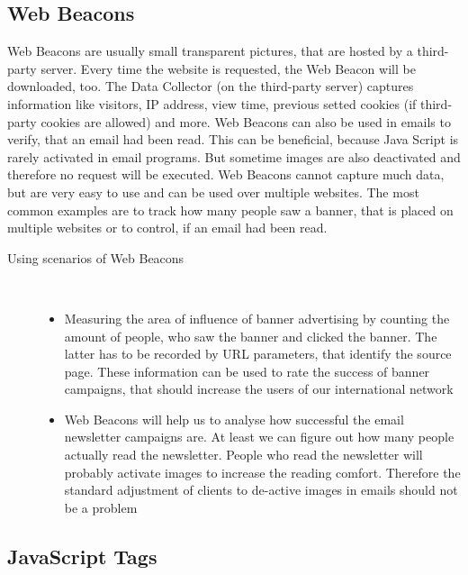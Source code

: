 \subsection{Web Beacons} %
\label{sub:web_beacons}
Web Beacons are usually small transparent pictures, that are hosted by a third-party server. Every time the website is requested, the Web Beacon will be downloaded, too. The Data Collector (on the third-party server) captures information like visitors, IP address, view time, previous setted cookies (if third-party cookies are allowed) and more. Web Beacons can also be used in emails to verify, that an email had been read. This can be beneficial, because Java Script is rarely activated in email programs. But sometime images are also deactivated and therefore no request will be executed. Web Beacons cannot capture much data, but are very easy to use and can be used over multiple websites. The most common examples are to track how many people saw a banner, that is placed on multiple websites or to control, if an email had been read.\citep[p. 28-30]{Kaushik07} 

\begin{description}
   \item[Using scenarios of Web Beacons]~\par
   \begin{itemize}
      \item Measuring the area of influence of banner advertising by counting the amount of people, who saw the banner and clicked the banner. The latter has to be recorded by URL parameters, that identify the source page. These information can be used to rate the success of banner campaigns, that should increase the users of our international network
      \item Web Beacons will help us to analyse how successful the email newsletter campaigns are. At least we can figure out how many people actually read the newsletter. People who read the newsletter will probably activate images to increase the reading comfort. Therefore the standard adjustment of clients to de-active images in emails should not be a problem
   \end{itemize}
\end{description}

\subsection{JavaScript Tags} %
\label{sub:javascript_tags}

